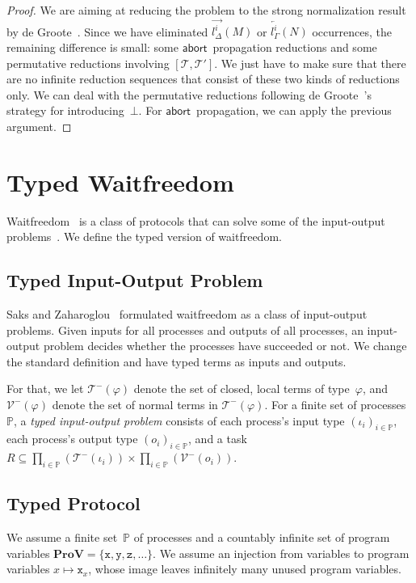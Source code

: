 \documentclass[doctor]{iscs-thesis}
\newcommand{\processes}{\mathbb{P}}
\newcommand{\ProV}{\mathbf{ProV}}
\newcommand{\p}[1]{\texttt{#1}}
\newcommand{\cotuple}[1]{[{#1}]}
\newcommand{\ltor}[4]{\overrightarrow{{#2}^{#1}_{#3}} \left({#4}\right)}
\newcommand{\rtol}[4]{\overleftarrow{{#2}^{#1}_{#3}} \left({#4}\right)}
\newcommand{\abort}{\mathsf{abort\,}}
\newcommand{\term} [0]{\mathcal{T}}
\newcommand{\lterm}[0]{\mathcal{T}^-}
\newcommand{\lval} [0]{\mathcal{V}^-}
\begin{document}
\begin{proof}
We are aiming at reducing the problem to the strong normalization result
by de Groote~\cite{Philippe2002js}.
Since we have eliminated $\ltor i l \Delta M$ or $\rtol i l\Gamma N$ occurrences,
the remaining difference is small: some $\abort$ propagation reductions
 and some permutative reductions involving $\cotuple{\term,\term'}$.
We just have to make sure that there are no infinite reduction sequences
that consist of these two kinds of reductions only.
We can deal with the permutative reductions following de
 Groote~\cite{Philippe2002js}'s strategy for introducing~$\bot$.
For $\abort$ propagation, we can apply the previous argument.
\end{proof}

\section{Typed Waitfreedom}
\label{waitfreedom}

Waitfreedom~\cite{Herlihy88,Saks:1993vq} is a class of protocols
that can solve
some of the input-output problems~\cite{Moran:1987ep,Biran:1988hh}.
We define the typed version of waitfreedom.

\subsection{Typed Input-Output Problem}

Saks and Zaharoglou~\cite{Saks:1993vq} formulated waitfreedom as a class
of input-output
problems.
Given inputs for all processes and outputs of all
processes, an input-output problem decides whether the processes have
succeeded or not.
We change the standard definition and have typed terms as inputs and
outputs.

For that, we let $\lterm(\varphi)$ denote the set of closed, local terms of
type~$\varphi$,
and $\lval(\varphi)$ denote the set of normal terms in $\lterm(\varphi)$.
For a finite set of processes~$\processes$, 
a \textit{typed input-output problem} consists of each process's input type
$(\iota_i)_{i\in \processes}$, each process's output type $(o_i)_{i\in
\processes}$, and a
task $R\subseteq \prod_{i\in \processes}\left(\lterm(\iota_i)\right)\times
 \prod_{i\in \processes}\left(\lval(o_i)\right)$.

\subsection{Typed Protocol}

We assume a finite set~$\processes$
of processes and a countably infinite
set of program variables $\ProV =\{\p x, \p y, \p z, \ldots\}$.
We assume an injection from variables to program variables $x\mapsto
\p{x}_x$, whose image leaves infinitely many unused program variables.
\end{document}
